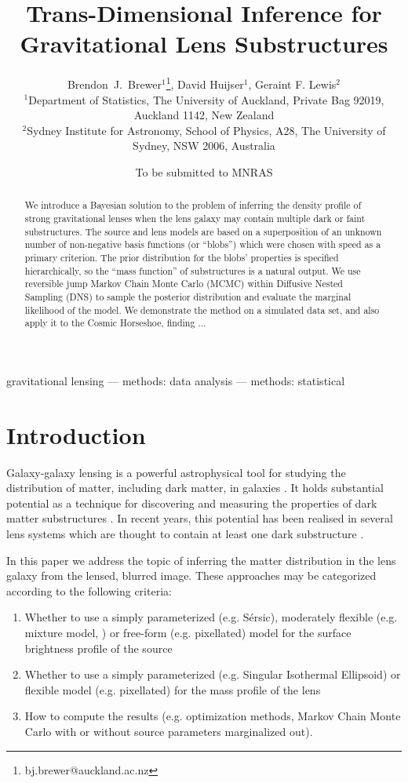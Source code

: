 \documentclass[useAMS,usenatbib]{mn2e}
\title[]
{Trans-Dimensional Inference for Gravitational Lens Substructures}
\author[Brewer, Huijser and Lewis]{%
  Brendon~J.~Brewer$^{1}$\thanks{bj.brewer@auckland.ac.nz},
  David Huijser$^{1}$,
  Geraint F. Lewis$^2$
  \medskip\\
  $^1$Department of Statistics, The University of Auckland, Private Bag 92019, Auckland 1142, New Zealand\\
  $^2$Sydney Institute for Astronomy, School of Physics, A28,
  The University of Sydney, NSW 2006, Australia}
\begin{document}
             
\date{To be submitted to MNRAS}
             
\maketitle

\label{firstpage}

\begin{abstract}
We introduce a Bayesian solution to the problem of inferring the density
profile of strong gravitational lenses when the lens galaxy may contain
multiple dark or faint substructures. The source and lens models are based on
a superposition of an unknown number of non-negative basis functions
(or ``blobs'') which were chosen with speed as a primary criterion.
The prior distribution for the blobs' properties is specified hierarchically,
so the ``mass function'' of substructures is a natural output. We use reversible
jump Markov Chain Monte Carlo (MCMC) within Diffusive Nested Sampling (DNS) to
sample the posterior distribution and evaluate the marginal likelihood of the
model. We demonstrate the method on a simulated data set, and also apply it to
the Cosmic Horseshoe, finding ...
\end{abstract}


\begin{keywords}
gravitational lensing --- methods: data analysis --- methods: statistical
\end{keywords}

\section{Introduction}
Galaxy-galaxy lensing is a powerful astrophysical tool for studying
the distribution of matter, including dark matter, in galaxies
\citep{treu}. It holds substantial potential as a technique for discovering
and measuring the properties of dark matter substructures \citep{koopmans}.
In recent years, this potential has been realised in several lens systems
which are thought to contain at least one dark substructure
\citep{vegetti1, vegetti2, vegetti3}.

In this paper we address the topic of
inferring the matter distribution in the lens galaxy from the lensed,
blurred image. These approaches may be categorized according to the following
criteria:
\begin{enumerate}
\item Whether to use a simply parameterized (e.g. Sérsic), moderately flexible
(e.g. mixture model, \citet{2011MNRAS.412.2521B})
or free-form (e.g. pixellated) model for the surface brightness profile of the source
\item Whether to use a simply parameterized (e.g. Singular Isothermal Ellipsoid)
or flexible model (e.g. pixellated) for the mass profile of the lens
\item How to compute the results (e.g. optimization methods, Markov Chain
Monte Carlo with or without source parameters marginalized out).
\end{enumerate}
\end{document}
